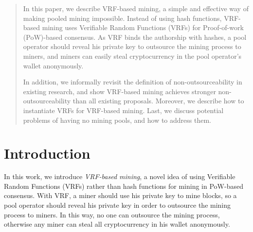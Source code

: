 \documentclass[a0,portrait]{a0poster}
\begin{document}
\begin{multicols}{2} %


\color{Navy} %

\begin{abstract}
    In this paper, we describe VRF-based mining, a simple and effective way of making pooled mining impossible.
    Instead of using hash functions, VRF-based mining uses Verifiable Random Functions (VRFs) for Proof-of-work (PoW)-based consensus.
    As VRF binds the authorship with hashes, a pool operator should reveal his private key to outsource the mining process to miners, and miners can easily steal cryptocurrency in the pool operator's wallet anonymously.

    In addition, we informally revisit the definition of non-outsourceability in existing research, and show VRF-based mining achieves stronger non-outsourceability than all existing proposals.
    Moreover, we describe how to instantiate VRFs for VRF-based mining.
    Last, we discuss potential problems of having no mining pools, and how to address them.
\end{abstract}


\color{SaddleBrown} %

\section*{Introduction}

In this work, we introduce \textit{VRF-based mining}, a novel idea of using Verifiable Random Functions (VRFs) rather than hash functions for mining in PoW-based consensus.
With VRF, a miner should use his private key to mine blocks, so a pool operator should reveal his private key in order to outsource the mining process to miners.
In this way, no one can outsource the mining process, otherwise any miner can steal all cryptocurrency in his wallet anonymously.


\end{multicols}
\end{document}

